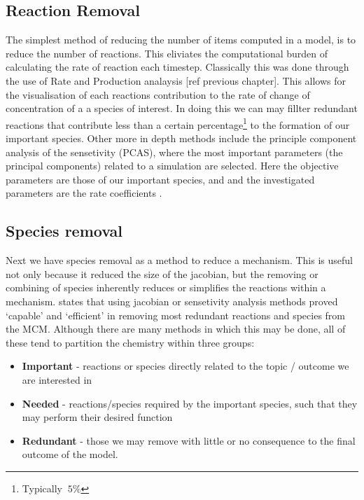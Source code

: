 \documentclass{pasa}%
\begin{document}
\subsection{Reaction Removal}
The simplest method of reducing the number of items computed in a model, is to reduce the number of reactions. This eliviates the computational burden of calculating the rate of reaction each timestep.
Classically this was done through the use of Rate and Production analaysis [ref previous chapter]. This allows for the visualisation of each reactions contribution to the rate of change of concentration of a a species of interest. In doing this we can may fillter redundant reactions that contribute less than a certain percentage\footnote{Typically $~5\%$} to the formation of our important species. Other more in depth methods include the principle component analysis of the sensetivity (PCAS), where the most important parameters (the principal components) related to a simulation are selected. Here the objective parameters are those of our important species, and and the investigated parameters are the rate coefficients \cite{PCAS}.


\subsection{Species removal}
Next we have species removal as a method to reduce a mechanism. This is useful not only because it reduced the size of the jacobian, but the removing or combining of species inherently reduces or simplifies the reactions within a mechanism. \cite{whitehouse1} states that using jacobian or sensetivity analysis methods proved `capable' and `efficient' in removing most redundant reactions and species from the MCM. Although there are many methods in which this may be done, all of these tend to partition the chemistry within three groups:


\begin{itemize}
    \item \textbf{Important} - reactions or species directly related to the topic / outcome we are interested in
    \item \textbf{Needed} - reactions/species required by the important species, such that they may perform their desired function
    \item \textbf{Redundant} - those we may remove with little or no consequence to the final outcome of the model. 
\end{itemize}
\end{document}
